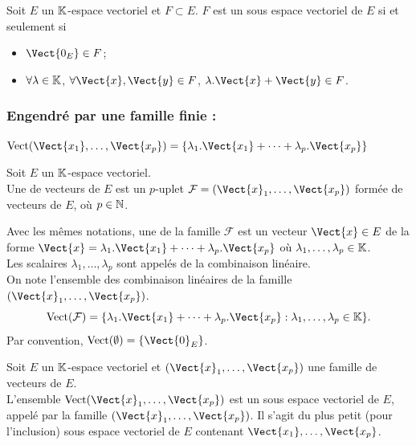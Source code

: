 \documentclass{book}
\begin{document}
\begin{Proposition}
Soit $E$ un $\mathbb{K} $-espace vectoriel et $F\subset E$.
$F$ est un sous espace vectoriel  de $E$ si et seulement si
\begin{itemize}
\item
  $\Vect{0_E}\in F$;
\item
  $\forall \lambda  \in \mathbb{K} $, $\forall  \Vect{x},\Vect{y} \in F$, $\lambda .\Vect{x} + \Vect{y} \in  F$.
\end{itemize}
\end{Proposition}
\subsubsection{Engendré par une famille finie :  }
$\Vectt (\Vect{x_1},\dots,\Vect{x_p})=\{\lambda_1. \Vect{x_1}+\dots + \lambda_p. \Vect{x_p} \}$
\begin{Definition}
Soit $E$ un $\mathbb{K} $-espace vectoriel.\\
Une  de vecteurs de $E$ est un $p$-uplet $\mathcal{F} = (\Vect{x}_1,\dots,\Vect{x_p})$ formée de vecteurs de $E$, où $p\in \mathbb{N}$.
\end{Definition}
\begin{Definition}
Avec les mêmes notations, une  de la famille $\mathcal{F}$ est un vecteur $\Vect{x} \in E$ de la forme $\Vect{x} = \lambda_1. \Vect{x_1}+\dots + \lambda_p. \Vect{x_p}$ où $\lambda_1,\dots,\lambda_p \in  \mathbb{K}$.\\
Les scalaires $\lambda_1,\dots,\lambda_p$ sont appelés  de la combinaison linéaire.\\
On note  l'ensemble des combinaison linéaires de la famille $(\Vect{x}_1,\dots,\Vect{x_p})$.\\
$$\Vectt (\mathcal{F})=\{ \lambda_1. \Vect{x_1}+\dots + \lambda_p. \Vect{x_p} : \lambda_1,\dots,\lambda_p \in  \K \}.$$
Par convention, $\Vectt(\emptyset)= \{\Vect{0}_E\}$.
\end{Definition}
\begin{DefinitionProposition}
Soit $E$ un $\mathbb{K} $-espace vectoriel et $(\Vect{x}_1,\dots,\Vect{x_p})$ une famille de vecteurs de $E$.\\
L'ensemble $\Vectt(\Vect{x}_1,\dots,\Vect{x_p})$ est un sous espace vectoriel  de $E$, appelé  par la famille $(\Vect{x}_1,\dots,\Vect{x_p})$.
Il s'agit du plus petit (pour l'inclusion) sous espace vectoriel  de $E$ contenant $\Vect{x_1},\dots,\Vect{x_p}$.
\end{DefinitionProposition}
\end{document}
